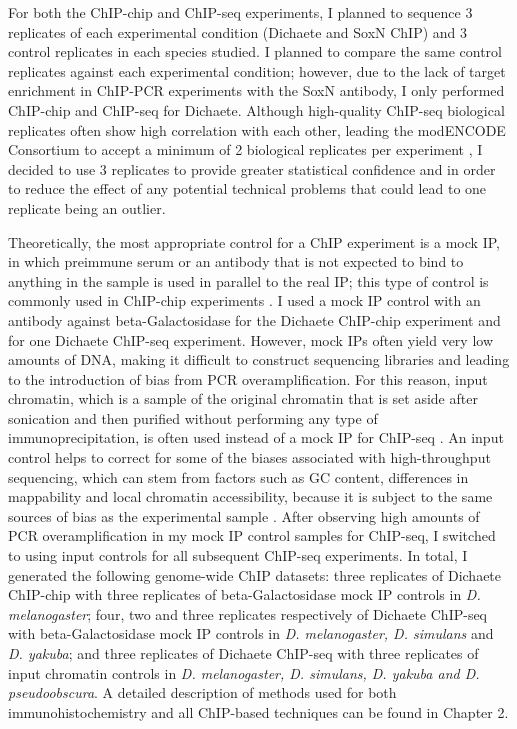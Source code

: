 For both the ChIP-chip and ChIP-seq experiments, I planned to sequence 3 replicates of each experimental condition (Dichaete and SoxN ChIP) and 3 control replicates in each species studied. I planned to compare the same control replicates against each experimental condition; however, due to the lack of target enrichment in ChIP-PCR experiments with the SoxN antibody, I only performed ChIP-chip and ChIP-seq for Dichaete. Although high-quality ChIP-seq biological replicates often show high correlation with each other, leading the modENCODE Consortium to accept a minimum of 2 biological replicates per experiment \citep{landt_chip-seq_2012}, I decided to use 3 replicates to provide greater statistical confidence and in order to reduce the effect of any potential technical problems that could lead to one replicate being an outlier. 

Theoretically, the most appropriate control for a ChIP experiment is a mock IP, in which preimmune serum or an antibody that is not expected to bind to anything in the sample is used in parallel to the real IP; this type of control is commonly used in ChIP-chip experiments \citep{ghavi-helm_analyzing_2012, park_widespread_2013}. I used a mock IP control with an antibody against beta-Galactosidase for the Dichaete ChIP-chip experiment and for one Dichaete ChIP-seq experiment. However, mock IPs often yield very low amounts of DNA, making it difficult to construct sequencing libraries and leading to the introduction of bias from PCR overamplification. For this reason, input chromatin, which is a sample of the original chromatin that is set aside after sonication and then purified without performing any type of immunoprecipitation, is often used instead of a mock IP for ChIP-seq \citep{ghavi-helm_analyzing_2012}. An input control helps to correct for some of the biases associated with high-throughput sequencing, which can stem from factors such as GC content, differences in mappability and local chromatin accessibility, because it is subject to the same sources of bias as the experimental sample \citep{dohm_substantial_2008}. After observing high amounts of PCR overamplification in my mock IP control samples for ChIP-seq, I switched to using input controls for all subsequent ChIP-seq experiments. In total, I generated the following genome-wide ChIP datasets: three replicates of Dichaete ChIP-chip with three replicates of beta-Galactosidase mock IP controls in \emph{D. melanogaster}; four, two and three replicates respectively of Dichaete ChIP-seq with beta-Galactosidase mock IP controls in \emph{D. melanogaster, D. simulans} and \emph{D. yakuba}; and three replicates of Dichaete ChIP-seq with three replicates of input chromatin controls in \emph{D. melanogaster, D. simulans, D. yakuba and D. pseudoobscura}. A detailed description of methods used for both immunohistochemistry and all ChIP-based techniques can be found in Chapter 2.

